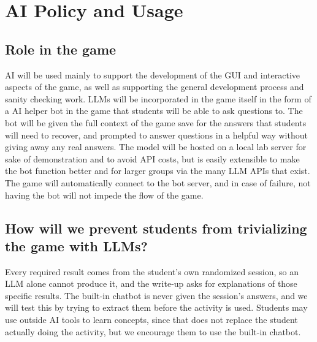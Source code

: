 \documentclass[11pt]{article}
\begin{document}
\section{AI Policy and Usage}
 
\subsection{Role in the game}
AI will be used mainly to support the development of the GUI and interactive aspects of the game, as well as supporting the general development process and sanity checking work. LLMs will be incorporated in the game itself in the form of a AI helper bot in the game that students will be able to ask questions to. The bot will be given the full context of the game save for the answers that students will need to recover, and prompted to answer questions in a helpful way without giving away any real answers. The model will be hosted on a local lab server for sake of demonstration and to avoid API costs, but is easily extensible to make the bot function better and for larger groups via the many LLM APIs that exist. The game will automatically connect to the bot server, and in case of failure, not having the bot will not impede the flow of the game.
 
\subsection{How will we prevent students from trivializing the game with LLMs?}
Every required result comes from the student’s own randomized session, so an LLM alone cannot produce it, and the write-up asks for explanations of those specific results. The built-in chatbot is never given the session’s answers, and we will test this by trying to extract them before the activity is used. Students may use outside AI tools to learn concepts, since that does not replace the student actually doing the activity, but we encourage them to use the built-in chatbot.
\end{document}
